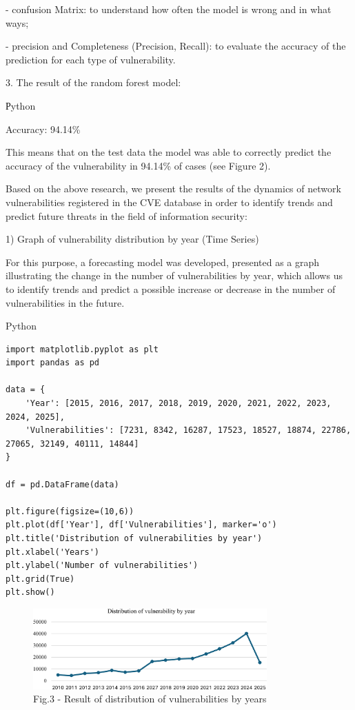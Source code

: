 \begin{multicols}{2}
- confusion Matrix: to understand how often the model is wrong and in
what ways;

- precision and Completeness (Precision, Recall): to evaluate the
accuracy of the prediction for each type of vulnerability.

3. The result of the random forest model:

Рython

Accuracy: 94.14\%

This means that on the test data the model was able to correctly predict
the accuracy of the vulnerability in 94.14\% of cases (see Figure 2).

Based on the above research, we present the results of the dynamics of
network vulnerabilities registered in the CVE database in order to
identify trends and predict future threats in the field of information
security:

1) Graph of vulnerability distribution by year (Time Series)

For this purpose, a forecasting model was developed, presented as a
graph illustrating the change in the number of vulnerabilities by year,
which allows us to identify trends and predict a possible increase or
decrease in the number of vulnerabilities in the future.
\end{multicols}

Python

\begin{lstlisting}
import matplotlib.pyplot as plt
import pandas as pd

data = {
    'Year': [2015, 2016, 2017, 2018, 2019, 2020, 2021, 2022, 2023, 2024, 2025],
    'Vulnerabilities': [7231, 8342, 16287, 17523, 18527, 18874, 22786, 27065, 32149, 40111, 14844]
}

df = pd.DataFrame(data)

plt.figure(figsize=(10,6))
plt.plot(df['Year'], df['Vulnerabilities'], marker='o')
plt.title('Distribution of vulnerabilities by year')
plt.xlabel('Years')
plt.ylabel('Number of vulnerabilities')
plt.grid(True)
plt.show()
\end{lstlisting}

\begin{figure}[H]
	\centering
	\includegraphics[width=0.8\textwidth]{media/ict4/image4}
	\caption*{Fig.3 - Result of distribution of vulnerabilities by years}
\end{figure}

